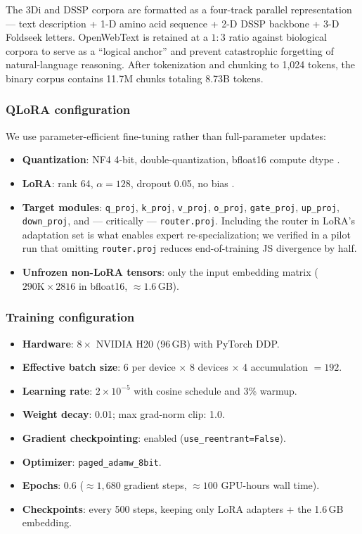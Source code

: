 \documentclass[11pt]{article}
\begin{document}
The 3Di \citep{vankempen2024foldseek} and DSSP \citep{kabsch1983dssp} corpora are formatted as a four-track parallel representation --- text description + 1-D amino acid sequence + 2-D DSSP backbone + 3-D Foldseek letters. OpenWebText \citep{gadre2021pile} is retained at a $1:3$ ratio against biological corpora to serve as a ``logical anchor'' and prevent catastrophic forgetting of natural-language reasoning. After tokenization and chunking to 1{,}024 tokens, the binary corpus contains 11.7M chunks totaling 8.73B tokens.

\subsubsection{QLoRA configuration}

We use parameter-efficient fine-tuning rather than full-parameter updates:
\begin{itemize}\setlength\itemsep{0pt}
\item \textbf{Quantization}: NF4 4-bit, double-quantization, bfloat16 compute dtype \citep{dettmers2023qlora}.
\item \textbf{LoRA}: rank 64, $\alpha = 128$, dropout 0.05, no bias \citep{hu2022lora}.
\item \textbf{Target modules}: \texttt{q\_proj}, \texttt{k\_proj}, \texttt{v\_proj}, \texttt{o\_proj}, \texttt{gate\_proj}, \texttt{up\_proj}, \texttt{down\_proj}, and --- critically --- \texttt{router.proj}. Including the router in LoRA's adaptation set is what enables expert re-specialization; we verified in a pilot run that omitting \texttt{router.proj} reduces end-of-training JS divergence by half.
\item \textbf{Unfrozen non-LoRA tensors}: only the input embedding matrix ($290\text{K} \times 2816$ in bfloat16, $\approx 1.6$\,GB).
\end{itemize}

\subsubsection{Training configuration}

\begin{itemize}\setlength\itemsep{0pt}
\item \textbf{Hardware}: $8 \times$ NVIDIA H20 (96\,GB) with PyTorch DDP.
\item \textbf{Effective batch size}: 6 per device $\times$ 8 devices $\times$ 4 accumulation $= 192$.
\item \textbf{Learning rate}: $2 \times 10^{-5}$ with cosine schedule and 3\% warmup.
\item \textbf{Weight decay}: 0.01; max grad-norm clip: 1.0.
\item \textbf{Gradient checkpointing}: enabled (\texttt{use\_reentrant=False}).
\item \textbf{Optimizer}: \texttt{paged\_adamw\_8bit}.
\item \textbf{Epochs}: 0.6 ($\approx 1{,}680$ gradient steps, $\approx 100$ GPU-hours wall time).
\item \textbf{Checkpoints}: every 500 steps, keeping only LoRA adapters + the 1.6\,GB embedding.
\end{itemize}
\end{document}
